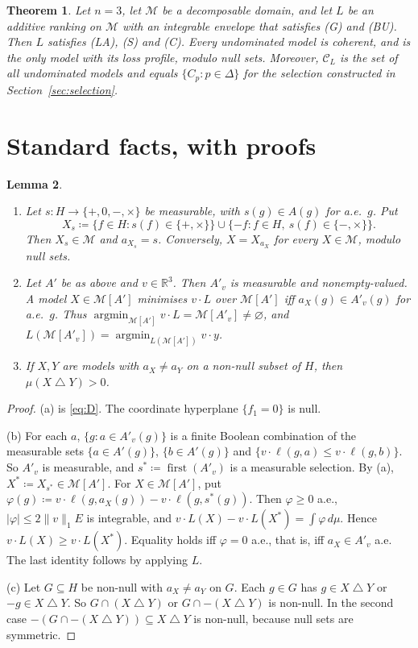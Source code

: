 \documentclass[11pt]{article}
\newtheorem{theorem}{Theorem}[section]
\newtheorem{lemma}[theorem]{Lemma}
\theoremstyle{remark}
\newcommand{\R}{\mathbb R}
\newcommand{\M}{\mathcal M}
\newcommand{\C}{\mathcal C}
\newcommand{\sd}{\mathbin{\triangle}}
\DeclareMathOperator*{\argmin}{argmin}
\newcommand{\first}{\operatorname{first}}
\begin{document}
\begin{theorem}\label{thm:ccibu}
Let $n=3$, let $\M$ be a decomposable domain, and let $L$ be an additive ranking on $\M$ with an integrable envelope that satisfies \textup{(G)} and \textup{(BU)}. Then $L$ satisfies \textup{(LA)}, \textup{(S)} and \textup{(C)}. Every undominated model is coherent, and is the only model with its loss profile, modulo null sets. Moreover, $\C_L$ is the set of all undominated models and equals $\{C_p:p\in\Delta\}$ for the selection constructed in Section~\ref{sec:selection}.
\end{theorem}

\section{Standard facts, with proofs}\label{sec:facts}

\begin{lemma}\label{lem:pointwise}
\begin{enumerate}[leftmargin=*,label=\textup{(\alph*)}]
\item Let $s:H\to\{+,0,-,\times\}$ be measurable, with $s(g)\in A(g)$ for a.e.\ $g$. Put
\[
X_s\coloneqq\{f\in H:s(f)\in\{+,\times\}\}\cup\{-f:f\in H,\ s(f)\in\{-,\times\}\}.
\]
Then $X_s\in\M$ and $a_{X_s}=s$. Conversely, $X=X_{a_X}$ for every $X\in\M$, modulo null sets.
\item Let $A'$ be as above and $v\in\R^3$. Then $A'_v$ is measurable and nonempty-valued. A model $X\in\M[A']$ minimises $v\cdot L$ over $\M[A']$ iff $a_X(g)\in A'_v(g)$ for a.e.\ $g$. Thus $\argmin_{\M[A']}v\cdot L=\M[A'_v]\ne\varnothing$, and $L(\M[A'_v])=\argmin_{L(\M[A'])}v\cdot y$.
\item If $X,Y$ are models with $a_X\ne a_Y$ on a non-null subset of $H$, then $\mu(X\sd Y)>0$.
\end{enumerate}
\end{lemma}

\begin{proof}
(a) is \eqref{eq:D}. The coordinate hyperplane $\{f_1=0\}$ is null.

(b) For each $a$, $\{g:a\in A'_v(g)\}$ is a finite Boolean combination of the measurable sets $\{a\in A'(g)\}$, $\{b\in A'(g)\}$ and $\{v\cdot\ell(g,a)\le v\cdot\ell(g,b)\}$. So $A'_v$ is measurable, and $s^*\coloneqq\first(A'_v)$ is a measurable selection. By (a), $X^*\coloneqq X_{s^*}\in\M[A']$. For $X\in\M[A']$, put $\varphi(g)\coloneqq v\cdot\ell(g,a_X(g))-v\cdot\ell(g,s^*(g))$. Then $\varphi\ge0$ a.e., $|\varphi|\le2\|v\|_1E$ is integrable, and $v\cdot L(X)-v\cdot L(X^*)=\int\varphi\,d\mu$. Hence $v\cdot L(X)\ge v\cdot L(X^*)$. Equality holds iff $\varphi=0$ a.e., that is, iff $a_X\in A'_v$ a.e. The last identity follows by applying $L$.

(c) Let $G\subseteq H$ be non-null with $a_X\ne a_Y$ on $G$. Each $g\in G$ has $g\in X\sd Y$ or $-g\in X\sd Y$. So $G\cap(X\sd Y)$ or $G\cap-(X\sd Y)$ is non-null. In the second case $-(G\cap-(X\sd Y))\subseteq X\sd Y$ is non-null, because null sets are symmetric.
\end{proof}
\end{document}
